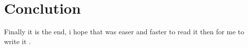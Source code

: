 \chapter{Conclution}\label{chap:Conclu}

\minitoc


Finally it is the end,  i hope that was easer  and faster to read it then for me to write it .
